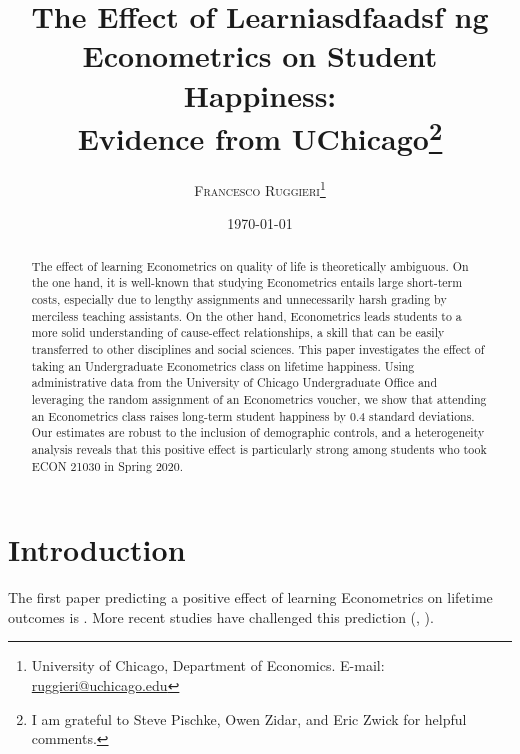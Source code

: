 \documentclass[12pt,notitlepage]{article}
\begin{document}
\title{The Effect of Learniasdfaadsf ng Econometrics on Student Happiness: \\ Evidence from UChicago\thanks{\noindent I am grateful to Steve Pischke, Owen Zidar, and Eric Zwick for helpful comments.}
	\vspace{0.2cm}
}
\author{
	\textsc{Francesco Ruggieri}\thanks{University of Chicago, Department of Economics. E-mail: \url{ruggieri@uchicago.edu}}\\
}


\date{\today}
\maketitle

\medskip

\begin{abstract}
	The effect of learning Econometrics on quality of life is theoretically ambiguous. On the one hand, it is well-known that studying Econometrics entails large short-term costs, especially due to lengthy assignments and unnecessarily harsh grading by merciless teaching assistants. On the other hand, Econometrics leads students to a more solid understanding of cause-effect relationships, a skill that can be easily transferred to other disciplines and social sciences. This paper investigates the effect of taking an Undergraduate Econometrics class on lifetime happiness. Using administrative data from the University of Chicago Undergraduate Office and leveraging the random assignment of an Econometrics voucher, we show that attending an Econometrics class raises long-term student happiness by 0.4 standard deviations. Our estimates are robust to the inclusion of demographic controls, and a heterogeneity analysis reveals that this positive effect is particularly strong among students who took ECON 21030 in Spring 2020.
\end{abstract}

\setcounter{page}{0}\thispagestyle{empty}
\doublespacing

\newpage

\section{Introduction}

The first paper predicting a positive effect of learning Econometrics on lifetime outcomes is \cite{chinasyndrome}. More recent studies have challenged this prediction (\citealt{acemoglu}, \citealt{polarization}).
\end{document}
